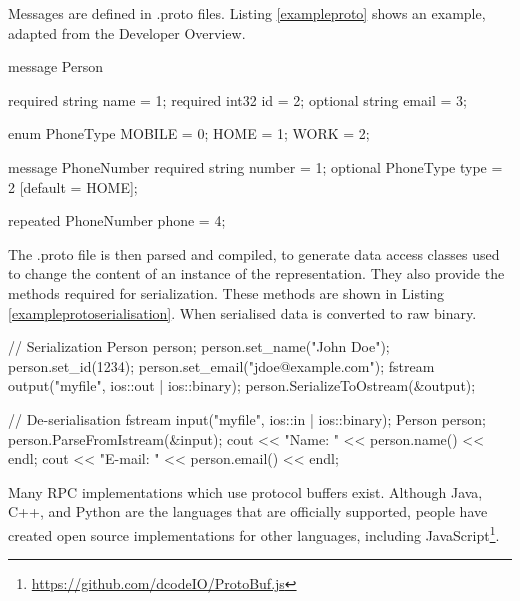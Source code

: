\begin{description}
	Messages are defined in .proto files. Listing \ref{exampleproto} shows an example, adapted from the Developer Overview.
	~\\

	\begin{code}
message Person {
  required string name = 1;
  required int32 id = 2;
  optional string email = 3;

  enum PhoneType {
    MOBILE = 0;
    HOME = 1;
    WORK = 2;
  }

  message PhoneNumber {
    required string number = 1;
    optional PhoneType type = 2 [default = HOME];
  }

  repeated PhoneNumber phone = 4;
}
	\end{code}

	The .proto file is then parsed and compiled, to generate data access classes used to change the content of an instance of the representation. They also provide the methods required for serialization. These methods are shown in Listing \ref{exampleprotoserialisation}. When serialised data is converted to raw binary.

	\begin{code}
// Serialization
Person person;
person.set_name("John Doe");
person.set_id(1234);
person.set_email("jdoe@example.com");
fstream output("myfile", ios::out | ios::binary);
person.SerializeToOstream(&output);

// De-serialisation 
fstream input("myfile", ios::in | ios::binary);
Person person;
person.ParseFromIstream(&input);
cout << "Name: " << person.name() << endl;
cout << "E-mail: " << person.email() << endl;
	\end{code}


	Many RPC implementations which use protocol buffers exist. Although Java, C++, and Python are the languages that are officially supported, people have created open source  implementations for other languages, including JavaScript\footnote{\url{https://github.com/dcodeIO/ProtoBuf.js}}.
\end{description}

